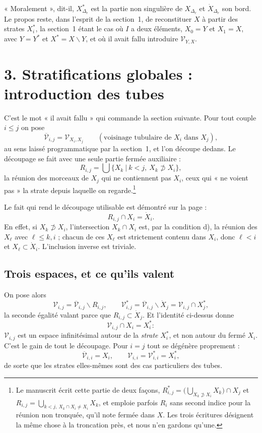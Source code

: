 \documentclass[11pt,a4paper]{article}
\begin{document}
« Moralement », dit-il, $X^{*}_{\Delta_{r}}$ est la partie non singulière de
$X_{\Delta_{r}}$ et $\dot{X}_{\Delta_{r}}$ son bord. Le propos reste, dans
l'esprit de la section~1, de reconstituer $X$ à partir des strates $X_{i}^{*}$,
la section~1 étant le cas où $I$ a deux éléments, $X_{0} = Y$ et $X_{1} = X$,
avec $Y = Y^{*}$ et $X^{*} = X \smallsetminus Y$, et où il avait fallu
introduire $\mathcal{V}_{Y,X}$.

\section*{3. Stratifications globales : introduction des tubes}

C'est le mot « il avait fallu » qui commande la section suivante. Pour tout
couple $i \leq j$ on pose
\[
  \overline{\mathcal{V}}_{i,j} = \mathcal{V}_{X_{i},X_{j}}
  \qquad (\text{voisinage tubulaire de } X_{i} \text{ dans } X_{j}),
\]
au sens laissé programmatique par la section~1, et l'on découpe dedans. Le
découpage se fait avec une seule partie fermée auxiliaire :
\[
  R_{i,j} = \bigcup \bigl\{ X_{k} \ \big|\ k < j,\ X_{k} \not\supset X_{i} \bigr\},
\]
la réunion des morceaux de $X_{j}$ qui ne contiennent pas $X_{i}$, ceux qui
« ne voient pas » la strate depuis laquelle on
regarde.\footnote{Le manuscrit écrit cette partie de deux façons, $R^{*}_{i,j} =
\bigl(\bigcup_{X_{k} \not\supset X_{i}} X_{k}\bigr) \cap X_{j}$ et
$R_{i,j} = \bigcup_{k<j,\ X_{k} \cap X_{i} \neq X_{i}} X_{k}$, et emploie parfois
$R_{i}$ sans second indice pour la réunion non tronquée, qu'il note fermée dans
$X$. Les trois écritures désignent la même chose à la troncation près, et nous
n'en gardons qu'une.}

Le fait qui rend le découpage utilisable est démontré sur
la page :
\[
  R_{i,j} \cap X_{i} = \dot{X}_{i}.
\]
En effet, si $X_{k} \not\supset X_{i}$, l'intersection $X_{k} \cap X_{i}$ est,
par la condition d), la réunion des $X_{\ell}$ avec $\ell \leq k,i$ ; chacun de
ces $X_{\ell}$ est strictement contenu dans $X_{i}$, donc $\ell < i$ et
$X_{\ell} \subset \dot{X}_{i}$. L'inclusion inverse est triviale.

\subsection*{Trois espaces, et ce qu'ils valent}

On pose alors
\[
  \mathcal{V}_{i,j} = \overline{\mathcal{V}}_{i,j} \smallsetminus R_{i,j},
  \qquad
  \mathcal{V}^{*}_{i,j} = \overline{\mathcal{V}}_{i,j} \smallsetminus \dot{X}_{j}
  = \mathcal{V}_{i,j} \cap X_{j}^{*},
\]
la seconde égalité valant parce que $R_{i,j} \subset \dot{X}_{j}$. Et
l'identité ci-dessus donne
\[
  \mathcal{V}_{i,j} \cap X_{i} = X_{i}^{*} :
\]
$\mathcal{V}_{i,j}$ est un espace infinitésimal autour de la \emph{strate}
$X_{i}^{*}$, et non autour du fermé $X_{i}$. C'est le gain de tout le découpage.
Pour $i = j$ tout se dégénère proprement :
\[
  \overline{\mathcal{V}}_{i,i} = X_{i}, \qquad
  \mathcal{V}_{i,i} = \mathcal{V}^{*}_{i,i} = X_{i}^{*},
\]
de sorte que les strates elles-mêmes sont des cas particuliers des tubes.
\end{document}
